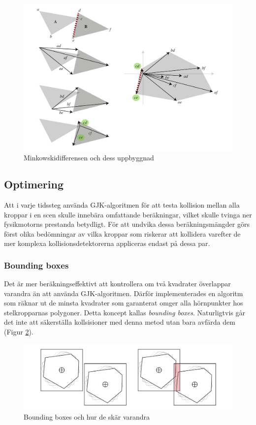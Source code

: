 \documentclass[a4paper,12pt,twopage,swedish]{article}
\begin{document}
\begin{figure}[H]
\centering
\includegraphics[width=1\textwidth]{illustrations/gjk.pdf}
\caption{Minkowskidifferensen och dess uppbyggnad}
\label{fig:gjk}
\end{figure}

\subsection{Optimering}

Att i varje tidssteg använda GJK-algoritmen för att testa kollision mellan alla kroppar i en scen skulle innebära omfattande beräkningar, vilket skulle tvinga ner fysikmotorns prestanda betydligt. För att undvika dessa beräkningsmängder görs först olika bedömningar av vilka kroppar som riskerar att kollidera varefter de mer komplexa kollisionsdetektorerna appliceras endast på dessa par.

\subsubsection{Bounding boxes}
Det är mer beräkningseffektivt att kontrollera om två kvadrater överlappar varandra än att använda GJK-algoritmen. Därför implementerades en algoritm som räknar ut de minsta kvadrater som garanterat omger alla hörnpunkter hos stelkropparnas polygoner. Detta koncept kallas \emph{bounding boxes}. Naturligtvis går det inte att säkerställa kollsisioner med denna metod utan bara avfärda dem (Figur \ref{fig:bounding_boxes}).

\begin{figure}[H]
\centering
\includegraphics[width=1\textwidth]{illustrations/boundingbox.pdf}
\caption{Bounding boxes och hur de skär varandra}
\label{fig:bounding_boxes}
\end{figure}
\end{document}
